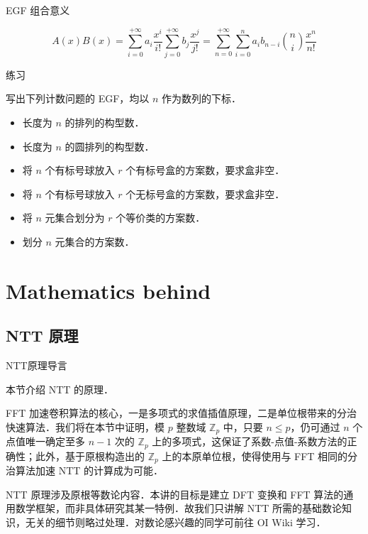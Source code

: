 \documentclass[fontset=fandol]{ctexbeamer}
\begin{document}
\begin{frame}{EGF 组合意义}

\[
A(x) B(x) = \sum_{i=0}^{+\infty} a_i \frac{x^i}{i!} \sum_{j=0}^{+\infty} b_j \frac{x^j}{j!}
= \sum_{n=0}^{+\infty} \sum_{i=0}^n a_i b_{n-i} \binom n i \frac{x^n}{n!}
\]

\begin{exampleblock}{练习}

写出下列计数问题的 EGF，均以 $n$ 作为数列的下标．

\begin{itemize}
    \item 长度为 $n$ 的排列的构型数．
    \item 长度为 $n$ 的圆排列的构型数．
    \item 将 $n$ 个有标号球放入 $r$ 个有标号盒的方案数，要求盒非空．
    \item 将 $n$ 个有标号球放入 $r$ 个无标号盒的方案数，要求盒非空．
    \item 将 $n$ 元集合划分为 $r$ 个等价类的方案数．
    \item 划分 $n$ 元集合的方案数．
\end{itemize}

\end{exampleblock}

\end{frame}

\section{Mathematics behind}

\subsection{NTT 原理}

\begin{frame}{NTT原理}{导言}

本节介绍 NTT 的原理．

FFT 加速卷积算法的核心，一是多项式的求值插值原理，二是单位根带来的分治快速算法．我们将在本节中证明，模 $p$ 整数域 $\mathbb Z_p$ 中，只要 $n \leq p$，仍可通过 $n$ 个点值唯一确定至多 $n-1$ 次的 $\mathbb Z_p$ 上的多项式，这保证了系数-点值-系数方法的正确性；此外，基于原根构造出的 $\mathbb Z_p$ 上的本原单位根，使得使用与 FFT 相同的分治算法加速 NTT 的计算成为可能．

NTT 原理涉及原根等数论内容．本讲的目标是建立 DFT 变换和 FFT 算法的通用数学框架，而非具体研究其某一特例．故我们只讲解 NTT 所需的基础数论知识，无关的细节则略过处理．对数论感兴趣的同学可前往 OI Wiki 学习．

\end{frame}
\end{document}
